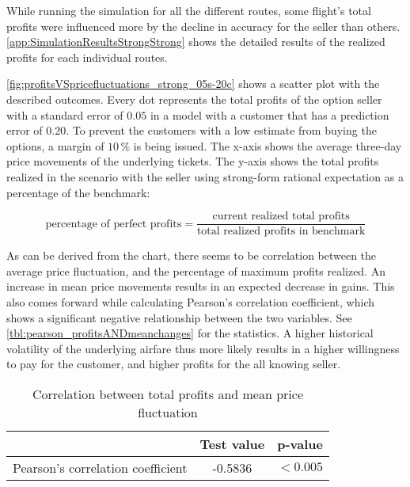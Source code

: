 
While running the simulation for all the different routes, some flight's total profits were influenced more by the decline in accuracy for the seller than others. \autoref{app:SimulationResultsStrongStrong} shows the detailed results of the realized profits for each individual routes.

\autoref{fig:profitsVSpricefluctuations_strong_05s-20c} shows a scatter plot with the described outcomes. Every dot represents the total profits of the option seller with a standard error of $0.05$ in a model with a customer that has a prediction error of $0.20$. To prevent the customers with a low estimate from buying the options, a margin of $10\,\%$ is being issued. The x-axis shows the average three-day price movements of the underlying tickets. The y-axis shows the total profits realized in the scenario with the seller using strong-form rational expectation as a percentage of the benchmark:

$$ \mbox{percentage of perfect profits} = \frac{\mbox{current realized total profits}}{\mbox{total realized profits in benchmark}} $$

As can be derived from the chart, there seems to be correlation between the average price fluctuation, and the percentage of maximum profits realized. An increase in mean price movements results in an expected decrease in gains. This also comes forward while calculating Pearson's correlation coefficient, which shows a significant negative relationship between the two variables. See \autoref{tbl:pearson_profitsANDmeanchanges} for the statistics. A higher historical volatility of the underlying airfare thus more likely results in a higher willingness to pay for the customer, and higher profits for the all knowing seller.


\begin{table}
\centering
\begin{tabular}{l c c}
\toprule
~  &  Test value  &  p-value  \\
\midrule
Pearson's correlation coefficient   &  -0.5836  &  $< 0.005$ \\
\bottomrule
\end{tabular}
\caption{Correlation between total profits and mean price fluctuation}
\label{tbl:pearson_profitsANDmeanchanges}
\end{table}


